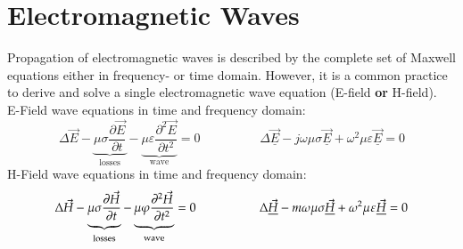 \section{Electromagnetic Waves}
Propagation of electromagnetic waves is described by the complete set of Maxwell equations either in frequency- or time domain. However, it is a common practice to derive and solve a single electromagnetic wave equation (E-field \textbf{or} H-field).\\

E-Field wave equations in time and frequency domain:
\begin{equation*}
	\Delta \vec{E} - \underbrace{\mu\sigma\frac{\partial \vec{E}}{\partial t}}_{\textrm{losses}} - \underbrace{\mu\varepsilon\frac{\partial^2 \vec{E}}{\partial t^2}}_{\textrm{wave}} = 0
	\hspace{2cm}
	\Delta \underline{\vec{E}} - j\omega\mu\sigma\underline{\vec{E}} + \omega^2\mu\varepsilon\underline{\vec{E}} = 0
\end{equation*}
H-Field wave equations in time and frequency domain:
\begin{equation*}
	\Delta\vec{H} - \underbrace{\mu\sigma\frac{\partial \vec{H}}{\partial t}}_{\textrm{losses}} - \underbrace{\mu\varphi\frac{\partial^2 \vec{H}}{\partial t^2}}_{\textrm{wave}} = 0
	\hspace{1.8cm}
	\Delta \underline{\vec{H}} - m\omega\mu\sigma\underline{\vec{H}} + \omega^2\mu\varepsilon\underline{\vec{H}} = 0
\end{equation*}
